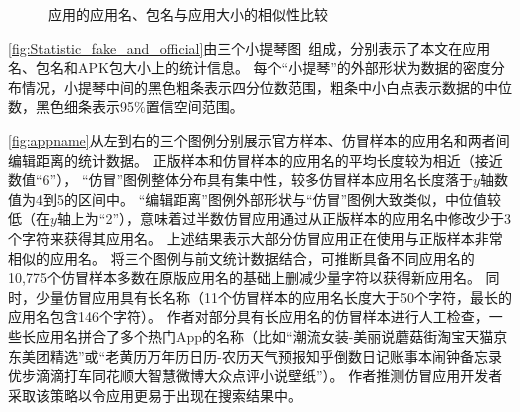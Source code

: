 \begin{figure}[htbp]
    \centering
    \hfill
    \hfill
    \hfill
    \caption{应用的应用名、包名与应用大小的相似性比较}
    \label{fig:Statistic_fake_and_official}
    \vspace{-5mm}
\end{figure}

\autoref{fig:Statistic_fake_and_official}由三个小提琴图~\cite{violinplot}组成，分别表示了本文在应用名、包名和APK包大小上的统计信息。
每个``小提琴''的外部形状为数据的密度分布情况，小提琴中间的黑色粗条表示四分位数范围，粗条中小白点表示数据的中位数，黑色细条表示95\%置信空间范围。

\autoref{fig:appname}从左到右的三个图例分别展示官方样本、仿冒样本的应用名和两者间编辑距离的统计数据。
正版样本和仿冒样本的应用名的平均长度较为相近（接近数值``6''），
``仿冒''图例整体分布具有集中性，较多仿冒样本应用名长度落于$y$轴数值为4到5的区间中。
``编辑距离''图例外部形状与``仿冒''图例大致类似，中位值较低（在$y$轴上为``2''），意味着过半数仿冒应用通过从正版样本的应用名中修改少于3个字符来获得其应用名。
上述结果表示大部分仿冒应用正在使用与正版样本非常相似的应用名。
将三个图例与前文统计数据结合，可推断具备不同应用名的10,775个仿冒样本多数在原版应用名的基础上删减少量字符以获得新应用名。
同时，少量仿冒应用具有长名称（11个仿冒样本的应用名长度大于50个字符，最长的应用名包含146个字符）。
作者对部分具有长应用名的仿冒样本进行人工检查，一些长应用名拼合了多个热门App的名称（比如``潮流女装-美丽说蘑菇街淘宝天猫京东美团精选''或``老黄历万年历日历-农历天气预报知乎倒数日记账事本闹钟备忘录优步滴滴打车同花顺大智慧微博大众点评小说壁纸''）。
作者推测仿冒应用开发者采取该策略以令应用更易于出现在搜索结果中。

